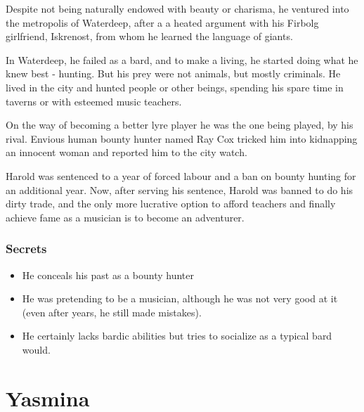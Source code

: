\documentclass[10pt,onecolumn,twoside,openany,bg=full,layout=true]{dndbook}
\begin{document}
Despite not being naturally endowed with beauty or charisma, he ventured into the metropolis of Waterdeep, after a
a heated argument with his Firbolg girlfriend, Iskrenost, from whom he learned the language of giants.

In Waterdeep, he failed as a bard, and to make a living, he started doing what he knew best - hunting.
But his prey were not animals, but mostly criminals.
He lived in the city and hunted people or other beings, spending his spare time in taverns or with esteemed music teachers.

On the way of becoming a better lyre player he was the one being played, by his rival.
Envious human bounty hunter named Ray Cox tricked him into kidnapping an innocent woman and
reported him to the city watch.\par
Harold was sentenced to a year of forced labour and a ban on bounty hunting for an additional year.
Now, after serving his sentence, Harold was banned to do his dirty trade, and the only more
lucrative option to afford teachers and finally achieve fame as a musician is to become an adventurer.
\subsubsection{Secrets}
  \begin{itemize}
    \item He conceals his past as a bounty hunter
    \item He was pretending to be a musician, although he was not very good at it (even after years, he still made mistakes).
    \item He certainly lacks bardic abilities but tries to socialize as a typical bard would.
  \end{itemize}

\vfill
\pagebreak


\section{Yasmina}\label{sec:yasmina}
\end{document}
